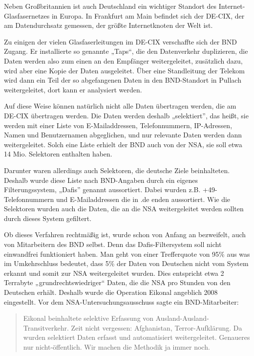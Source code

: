 \documentclass[12pt,a4paper]{scrartcl}
\begin{document}
Neben Großbritannien ist auch Deutschland ein wichtiger Standort des Internet-Glasfasernetzes in Europa. In Frankfurt am Main befindet sich der DE-CIX, der am Datendurchsatz gemessen, der größte Internetknoten der Welt ist.\cite{decix_facts}

Zu einigen der vielen Glasfaserleitungen im DE-CIX verschaffte sich der BND Zugang. Er installierte so genannte „Taps“, die den Datenverkehr duplizieren, die Daten werden also zum einen an den Empfänger weitergeleitet, zusätzlich dazu, wird aber eine Kopie der Daten ausgeleitet.\cite{wiki_eikonal} Über eine Standleitung der Telekom wird dann ein Teil der so abgefangenen Daten in den BND-Standort in Pullach weitergeleitet, dort kann er analysiert werden.\cite{zeit_eikonal}

Auf diese Weise können natürlich nicht alle Daten übertragen werden, die am DE-CIX übertragen werden. Die Daten werden deshalb „selektiert”, das heißt, sie werden mit einer Liste von E-Mailaddressen, Telefonnummern, IP-Adressen, Namen und Benutzernamen abgeglichen, und nur relevante Daten werden dann weitergeleitet. Solch eine Liste erhielt der BND auch von der NSA, sie soll etwa 14 Mio. Selektoren enthalten haben.\cite{ard_selektoren}

Darunter waren allerdings auch Selektoren, die deutsche Ziele beinhalteten. Deshalb wurde diese Liste nach BND-Angaben durch ein eigenes Filterungssystem, „Dafis” genannt aussortiert. Dabei wurden z.B. +49-Telefonnummern und E-Mailaddressen die in .de enden aussortiert. Wie die Selektoren wurden auch die Daten, die an die NSA weitergeleitet werden sollten durch dieses System gefiltert.\cite{bundestag_selektoren}

Ob dieses Verfahren rechtmäßig ist, wurde schon von Anfang an bezweifelt, auch von Mitarbeitern des BND selbst. Denn das Dafis-Filtersystem soll nicht einwandfrei funktioniert haben. Man geht von einer Trefferquote von 95\% aus was im Umkehrschluss bedeutet, dass 5\% der Daten von Deutschen nicht vom System erkannt und somit zur NSA weitergeleitet wurden. Dies entspricht etwa 2 Terrabyte „grundrechtswiedriger“ Daten, die die NSA pro Stunden von den Deutschen erhält.\cite{wiki_eikonal} Deshalb wurde die Operation Eikonal angeblich 2008 eingestellt. Vor dem NSA-Untersuchungsausschuss sagte ein BND-Mitarbeiter:

\begin{quote}
Eikonal beinhaltete selektive Erfassung von Ausland-Ausland-Transitverkehr. Zeit nicht vergessen: Afghanistan, Terror-Aufklärung. Da wurden selektiert Daten erfasst und automatisiert weitergeleitet. Genaueres nur nicht-öffentlich. Wir machen die Methodik ja immer noch.\cite{wiki_eikonal}
\end{quote}
\end{document}
